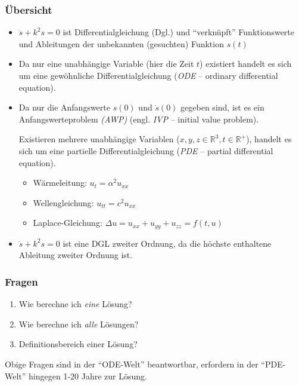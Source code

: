 
\subsubsection*{Übersicht}

\begin{itemize}
	\item $\ddot s + k^2s = 0$ ist Differentialgleichung (Dgl.) und "`verknüpft"' Funktionswerte und Ableitungen der unbekannten (gesuchten) Funktion $s(t)$
	\item Da nur eine unabhängige Variable (hier die Zeit $t$) existiert handelt es sich um eine gewöhnliche Differentialgleichung (\emph{ODE} -- ordinary differential equation).
	\item Da nur die Anfangswerte $s(0)$ und $\dot s(0)$ gegeben sind, ist es ein Anfangswerteproblem \emph{(AWP)} (engl. \emph{IVP} -- initial value problem).
	\begin{note}
		Existieren mehrere unabhängige Variablen ($x, y, z \in \mathbb{R}^3, t \in \mathbb{R}^+$), handelt es sich um eine partielle Differentialgleichung (\emph{PDE} -- partial differential equation).
	\end{note}
	\begin{example}
		\begin{itemize}
			\item Wärmeleitung: $u_t = \alpha^2 u_{xx}$
			\item Wellengleichung: $u_{tt} = c^2 u_{xx}$
			\item Laplace-Gleichung: $\Delta u = u_{xx} + u_{yy} + u_{zz} = f(t, u)$
		\end{itemize}
	\end{example}
	\item $\ddot s + k^2s = 0$ ist eine DGL zweiter Ordnung, da die höchste enthaltene Ableitung zweiter Ordnung ist.
\end{itemize}

\subsubsection*{Fragen}
\begin{enumerate}
	\item Wie berechne ich \emph{eine} Lösung?
	\item Wie berechne ich \emph{alle} Lösungen?
	\item Definitionsbereich einer Lösung?
\end{enumerate}
Obige Fragen sind in der "`ODE-Welt"' beantwortbar, erfordern in der "`PDE-Welt"' hingegen 1-20 Jahre zur Lösung.

